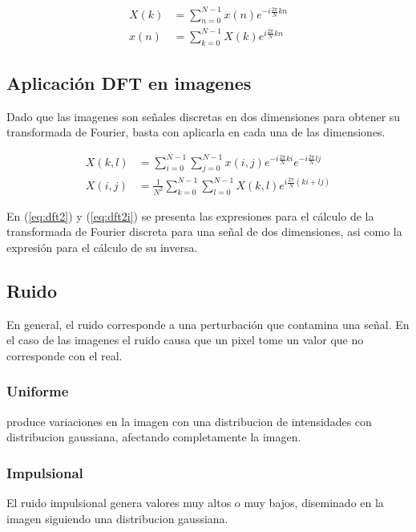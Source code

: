 \documentclass[
  letterpaper,
  twocolumn,
  9pt,
  journal,
  final]{IEEEtran}
\begin{document}
\begin{align}
	X(k) &= \sum_{n=0}^{N-1} x(n) e ^{-i \frac{2\pi}{N} k n } \label{eq:dft} \\
	x(n) &= \sum_{k=0}^{N-1} X(k) e ^{ i \frac{2\pi}{N} k n } \label{eq:dfti}
\end{align}

\subsection{Aplicación DFT en imagenes}

Dado que las imagenes son señales discretas en dos dimensiones para obtener su transformada de Fourier, basta con aplicarla en cada una de las dimensiones.

\begin{align}
	X(k,l) &= \sum_{i=0}^{N-1} \sum_{j=0}^{N-1} x(i,j) e ^ {-i \frac{2\pi}{N} k i} e ^ {-i \frac{2\pi}{N} l j} \label{eq:dft2} \\
	X(i,j) &= \frac{1}{N^2} \sum_{k=0}^{N-1} \sum_{l=0}^{N-1} X(k,l) e ^ {i \frac{2\pi}{N} (ki +lj)} \label{eq:dft2i}
\end{align}

En (\ref{eq:dft2}) y (\ref{eq:dft2i}) se presenta las expresiones para el cálculo de la transformada de Fourier discreta para una señal de dos dimensiones, asi como la expresión para el cálculo de su inversa.


\subsection{Ruido}

En general, el ruido corresponde a una perturbación que contamina una señal. En el caso de las imagenes el ruido causa que un pixel tome un valor que no corresponde con el real.

\subsubsection{Uniforme}
produce variaciones en la imagen con una distribucion de intensidades con distribucion gaussiana, afectando completamente la imagen.

\subsubsection{Impulsional}
El ruido impulsional genera valores muy altos o muy bajos, diseminado en la imagen siguiendo una distribucion gaussiana.
\end{document}
